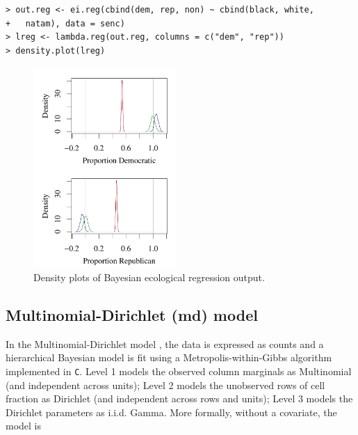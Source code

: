 \documentclass[12pt]{article}
\begin{document}
\begin{verbatim}
> out.reg <- ei.reg(cbind(dem, rep, non) ~ cbind(black, white, 
+   natam), data = senc)
> lreg <- lambda.reg(out.reg, columns = c("dem", "rep"))
> density.plot(lreg)
\end{verbatim}
\begin{figure}[h]
\begin{center}
\includegraphics[height=3in]{eiBayesReg.pdf}
\end{center}
\caption{Density plots of Bayesian ecological regression output.}
\label{f:er}
\end{figure}



\subsection{Multinomial-Dirichlet ({\sc md}) model}

In the Multinomial-Dirichlet model \citep{RosJiaKin01}, the
data is expressed as counts and a hierarchical Bayesian model is fit using a
Metropolis-within-Gibbs algorithm implemented in \texttt{C}.  Level 1
models the observed column marginals as Multinomial (and independent
across units); Level 2 models the unobserved rows of cell fraction as
Dirichlet (and independent across rows and units); Level 3 models the
Dirichlet parameters as i.i.d. Gamma.  More formally, without a
covariate, the model is
\end{document}
